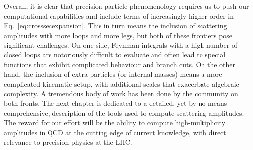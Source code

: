 \documentclass[main.tex]{subfiles}
\begin{document}
Overall, it is clear that precision particle phenomenology requires us to push our computational capabilities and include terms of increasingly higher order in Eq.~\ref{eq:crosssecexpansion}. This in turn means the inclusion of scattering amplitudes with more loops and more legs, but both of these frontiers pose significant challenges. On one side, Feynman integrals with a high number of closed loops are notoriously difficult to evaluate and often lead to special functions that exhibit complicated behaviour and branch cuts. On the other hand, the inclusion of extra particles (or internal masses) means a more complicated kinematic setup, with additional scales that exacerbate algebraic complexity.  A tremendous body of work has been done by the community on both fronts. The next chapter is dedicated to a detailed, yet by no means comprehensive, description of the tools used to compute scattering amplitudes. The reward for our effort will be the ability to compute high-multiplicity amplitudes in QCD at the cutting edge of current knowledge, with direct relevance to precision physics at the LHC.
\end{document}
